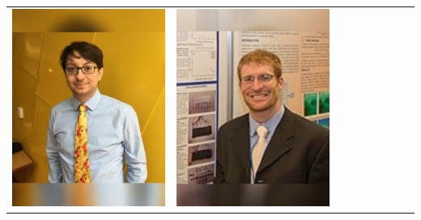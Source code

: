 \documentclass[landscape,a0paper,fontscale=0.292]{baposter}
\begin{document}
\begin{poster}
{\begin{center}
\begin{tabularx}{\linewidth}{X X X X X X X X X}
{\centering \includegraphics[width=0.65\linewidth]{carlone.jpg}}&
{\centering \includegraphics[width=0.65\linewidth]{dusek.jpg}}&

\end{tabularx}
\end{center}}
\end{poster}
\end{document}
